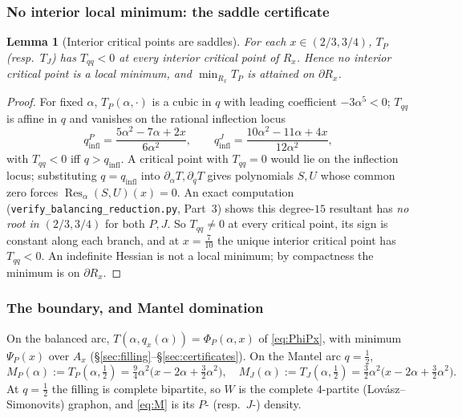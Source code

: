 \documentclass[11pt]{amsart}
\newtheorem{lemma}[theorem]{Lemma}
\theoremstyle{definition}
\newcommand{\1}{\mathbf 1}
\begin{document}
\subsubsection*{No interior local minimum: the saddle certificate}

\begin{lemma}[Interior critical points are saddles]
\label{lem:saddle}
For each $x\in(2/3,3/4)$, $T_P$ (resp.\ $T_J$) has $T_{qq}<0$ at every interior
critical point of $R_x$.  Hence no interior critical point is a local minimum,
and $\min_{R_x}T_P$ is attained on $\partial R_x$.
\end{lemma}

\begin{proof}
For fixed $\alpha$, $T_P(\alpha,\cdot)$ is a cubic in $q$ with leading
coefficient $-3\alpha^5<0$; $T_{qq}$ is affine in $q$ and vanishes on the
rational inflection locus
\[
   q_{\mathrm{infl}}^{P}=\frac{5\alpha^2-7\alpha+2x}{6\alpha^2},
   \qquad
   q_{\mathrm{infl}}^{J}=\frac{10\alpha^2-11\alpha+4x}{12\alpha^2},
\]
with $T_{qq}<0$ iff $q>q_{\mathrm{infl}}$.  A critical point with $T_{qq}=0$ would
lie on the inflection locus; substituting $q=q_{\mathrm{infl}}$ into
$\partial_\alpha T,\partial_q T$ gives polynomials $S,U$ whose common zero forces
$\operatorname{Res}_\alpha(S,U)(x)=0$.  An exact computation
(\texttt{verify\_balancing\_reduction.py}, Part~3) shows this degree-$15$
resultant has \emph{no root in $(2/3,3/4)$} for both $P,J$.  So $T_{qq}\ne0$ at
every critical point, its sign is constant along each branch, and at
$x=\tfrac7{10}$ the unique interior critical point has $T_{qq}<0$.  An indefinite
Hessian is not a local minimum; by compactness the minimum is on $\partial R_x$.
\end{proof}

\subsubsection*{The boundary, and Mantel domination}

On the balanced arc, $T(\alpha,q_x(\alpha))=\Phi_P(\alpha,x)$ of
\eqref{eq:PhiPx}, with minimum $\Psi_P(x)$ over $A_x$
(\S\ref{sec:filling}--\S\ref{sec:certificates}).  On the Mantel arc $q=\tfrac12$,
\begin{equation}
\label{eq:M}
   M_P(\alpha):=T_P(\alpha,\tfrac12)=\tfrac94\alpha^2\bigl(x-2\alpha+\tfrac32\alpha^2\bigr),
   \quad
   M_J(\alpha):=T_J(\alpha,\tfrac12)=\tfrac32\alpha^2\bigl(x-2\alpha+\tfrac32\alpha^2\bigr).
\end{equation}
At $q=\tfrac12$ the filling is complete bipartite, so $W$ is the complete
$4$-partite (Lov\'asz--Simonovits) graphon, and \eqref{eq:M} is its $P$- (resp.\
$J$-) density.
\end{document}
